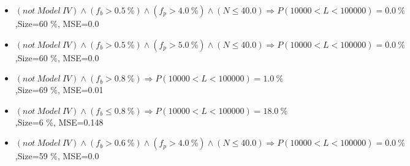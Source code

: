 \documentclass[numbered]{CSL}
\begin{document}
\begin{itemize}
\item $(not~Model~IV) \land (f_b > 0.5~\%) \land (f_p > 4.0~\%) \land (N \leq 40.0) \Rightarrow P(10 000 < L < 100 000) = 0.0~\%$,\hfill Size=60 \%, MSE=0.0
\item $(not~Model~IV) \land (f_b > 0.5~\%) \land (f_p > 5.0~\%) \land (N \leq 40.0) \Rightarrow P(10 000 < L < 100 000) = 0.0~\%$,\hfill Size=60 \%, MSE=0.0
\item $(not~Model~IV) \land (f_b > 0.8~\%) \Rightarrow P(10 000 < L < 100 000) = 1.0~\%$,\hfill Size=69 \%, MSE=0.01
\item $(not~Model~IV) \land (f_b \leq 0.8~\%) \Rightarrow P(10 000 < L < 100 000) = 18.0~\%$,\hfill Size=6 \%, MSE=0.148
\item $(not~Model~IV) \land (f_b > 0.6~\%) \land (f_p > 4.0~\%) \land (N \leq 40.0) \Rightarrow P(10 000 < L < 100 000) = 0.0~\%$,\hfill Size=59 \%, MSE=0.0
\end{itemize}
\end{document}
